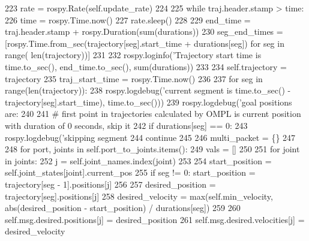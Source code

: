 \begin{DoxyCode}
{{{223         rate = rospy.Rate(self.update\_rate)
224         
225         \textcolor{keywordflow}{while} traj.header.stamp > time:
226             time = rospy.Time.now()
227             rate.sleep()
228             
229         end\_time = traj.header.stamp + rospy.Duration(sum(durations))
230         seg\_end\_times = [rospy.Time.from\_sec(trajectory[seg].start\_time + durations[seg]) \textcolor{keywordflow}{for} seg \textcolor{keywordflow}{in} range(
      len(trajectory))]
231         
232         rospy.loginfo(\textcolor{stringliteral}{'Trajectory start time is %
      time.to\_sec(), end\_time.to\_sec(), sum(durations))
233         
234         self.trajectory = trajectory
235         traj\_start\_time = rospy.Time.now()
236         
237         \textcolor{keywordflow}{for} seg \textcolor{keywordflow}{in} range(len(trajectory)):
238             rospy.logdebug(\textcolor{stringliteral}{'current segment is %
      time.to\_sec() - trajectory[seg].start\_time), time.to\_sec()))
239             rospy.logdebug(\textcolor{stringliteral}{'goal positions are: %
240             
241             \textcolor{comment}{# first point in trajectories calculated by OMPL is current position with duration of 0
       seconds, skip it}
242             \textcolor{keywordflow}{if} durations[seg] == 0:
243                 rospy.logdebug(\textcolor{stringliteral}{'skipping segment %
244                 \textcolor{keywordflow}{continue}
245                 
246             multi\_packet = \{\}
247             
248             \textcolor{keywordflow}{for} port, joints \textcolor{keywordflow}{in} self.port\_to\_joints.items():
249                 vals = []
250                 
251                 \textcolor{keywordflow}{for} joint \textcolor{keywordflow}{in} joints:
252                     j = self.joint\_names.index(joint)
253                     
254                     start\_position = self.joint\_states[joint].current\_pos
255                     \textcolor{keywordflow}{if} seg != 0: start\_position = trajectory[seg - 1].positions[j]
256                         
257                     desired\_position = trajectory[seg].positions[j]
258                     desired\_velocity = max(self.min\_velocity, abs(desired\_position - start\_position) / 
      durations[seg])
259                     
260                     self.msg.desired.positions[j] = desired\_position
261                     self.msg.desired.velocities[j] = desired\_velocity
}}}}}}}
\end{DoxyCode}
